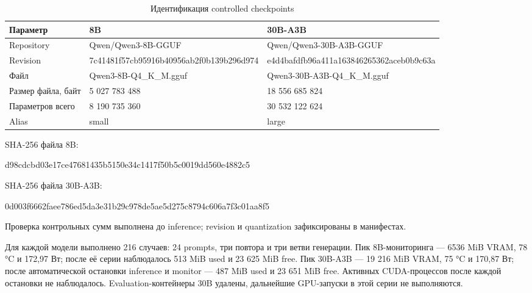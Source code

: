 \begin{table}[H]
    \centering
    \caption{Идентификация controlled checkpoints}
    \label{tab:controlled-checkpoints}
    \small
    \begin{tabularx}{\textwidth}{L{4cm}XX}
        \toprule
        Параметр & 8B & 30B-A3B \\
        \midrule
        Repository & Qwen/Qwen3-8B-GGUF & Qwen/Qwen3-30B-A3B-GGUF \\
        Revision & {\scriptsize\ttfamily 7c41481f57cb9591\allowbreak 6b40956ab2f0b139b296d974} & {\scriptsize\ttfamily e4d4bafdfb96a411\allowbreak a163846265362aceb0b9c63a} \\
        Файл & Qwen3-8B-Q4\_K\_M.gguf & Qwen3-30B-A3B-Q4\_K\_M.gguf \\
        Размер файла, байт & 5 027 783 488 & 18 556 685 824 \\
        Параметров всего & 8 190 735 360 & 30 532 122 624 \\
        Alias & small & large \\
        \bottomrule
    \end{tabularx}
\end{table}

SHA-256 файла 8B:
\begin{center}
\scriptsize\ttfamily d98cdcbd03e17ce476\allowbreak 81435b5150e34c1417f5\allowbreak 0b5c0019dd560e4882c5
\end{center}
SHA-256 файла 30B-A3B:
\begin{center}
\scriptsize\ttfamily 0d003f6662faee786e\allowbreak d5da3e31b29c978de5ae5d\allowbreak 275c8794c606a7f3c01aa8f5
\end{center}
Проверка контрольных сумм выполнена до inference; revision и quantization зафиксированы в манифестах.

Для каждой модели выполнено 216 случаев: 24 prompts, три повтора и три ветви генерации. Пик 8B-мониторинга --- 6536 MiB VRAM, 78 °C и 172,97 Вт; после её серии наблюдалось 513 MiB used и 23 625 MiB free. Пик 30B-A3B --- 19 216 MiB VRAM, 75 °C и 170,87 Вт; после автоматической остановки inference и monitor --- 487 MiB used и 23 651 MiB free. Активных CUDA-процессов после каждой остановки не наблюдалось. Evaluation-контейнеры 30B удалены, дальнейшие GPU-запуски в этой серии не выполняются.
